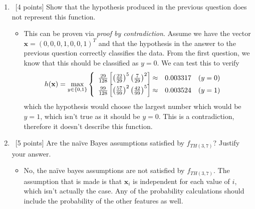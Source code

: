 \begin{enumerate}
\item ~[4 points] Show that the hypothesis produced in the previous question does not represent this function.
\begin{itemize}
\item This can be proven via {\em proof by contradiction}. Assume we have the vector $\mathbf{x}=(0,0,0,1,0,0,1)^{T}$ and that the hypothesis in the answer to the previous question correctly classifies the data. From the first question, we know that this should be classified as $y=0$. We can test this to verify
\begin{align}
h(\mathbf{x}) &= \max_{y\in \{0,1\}}\left\{ \begin{array}{l l r}
\frac{29}{128}\left[ \left(\frac{22}{29}\right)^{5}\left(\frac{7}{29}\right)^{2} \right]\approx & 0.003317 & (y=0)\\
\frac{99}{128}\left[ \left(\frac{57}{99}\right)^{2}\left(\frac{42}{99}\right)^{5} \right]\approx & 0.003524 & (y=1)
\end{array}\right.
\end{align}
which the hypothesis would choose the largest number which would be $y=1$, which isn't true as it should be $y=0$. This is a contradiction, therefore it doesn't describe this function.
\end{itemize}

\item ~[5 points] Are the na\"ive Bayes assumptions satisfied by
  $f_{TH(3,7)}$? Justify your answer.

\begin{itemize}
\item No, the na\"{i}ve bayes assumptions are not satisfied by $f_{TH(3,7)}$. The assumption that is made is that $\mathbf{x}_{i}$ is independent for each value of $i$, which isn't actually the case. Any of the probability calculations should include the probability of the other features as well.
\end{itemize}

\end{enumerate}
